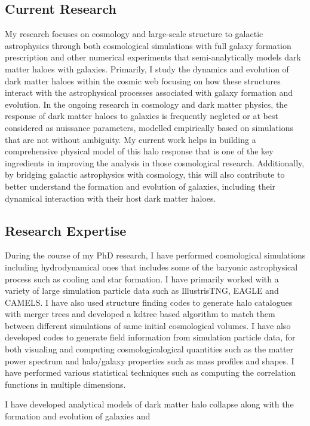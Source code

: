 \documentclass[12pt]{article}
\begin{document}
\subsection{Current Research}
My research focuses on cosmology and large-scale structure to galactic astrophysics through both cosmological simulations with full galaxy formation prescription and other numerical experiments that semi-analytically models dark matter haloes with galaxies. Primarily, I study the dynamics and evolution of dark matter haloes within the cosmic web focusing on how these structures interact with the astrophysical processes associated with galaxy formation and evolution. In the ongoing research in cosmology and dark matter physics, the response of dark matter haloes to galaxies is frequently negleted or at best considered as nuissance parameters, modelled empirically based on simulations that are not without ambiguity. My current work helps in building a comprehensive physical model of this halo response that is one of the key ingredients in improving the analysis in those cosmological research. Additionally, by bridging galactic astrophysics with cosmology, this will also contribute to better understand the formation and evolution of galaxies, including their dynamical interaction with their host dark matter haloes.

\subsection{Research Expertise}
During the course of my PhD research, I have performed cosmological simulations including hydrodynamical ones that includes some of the baryonic astrophysical process such as cooling and star formation. I have primarily worked with a variety of large simulation particle data such as IllustrisTNG, EAGLE and CAMELS. I have also used structure finding codes to generate halo catalogues with merger trees and developed a kdtree based algorithm to match them between different simulations of same initial cosmological volumes. I have also developed codes to generate field information from simulation particle data, for both visualing and computing cosmologicalogical quantities such as the matter power spectrum and halo/galaxy properties such as mass profiles and shapes. I have performed various statistical techniques such as computing the correlation functions in multiple dimensions. 

I have developed analytical models of dark matter halo collapse along with the formation and evolution of galaxies and 
\end{document}
